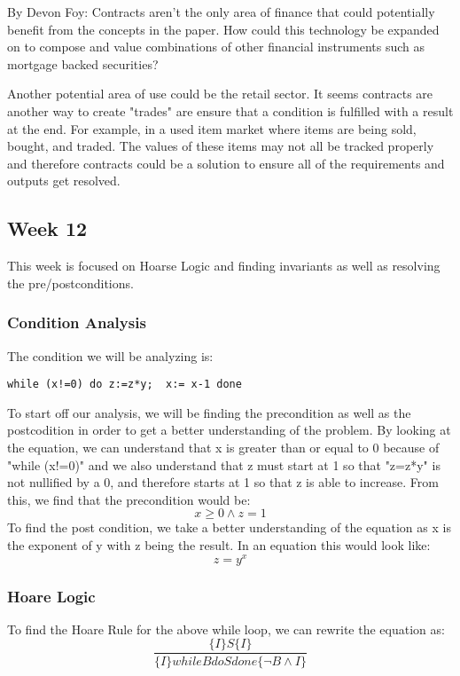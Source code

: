 \documentclass{article}
\theoremstyle{theorem}
\theoremstyle{definition}
\theoremstyle{remark}
\begin{document}
\medskip
By Devon Foy: Contracts aren't the only area of finance that could potentially benefit from the concepts in the paper. How could this technology be expanded on to compose and value combinations of other financial instruments such as mortgage backed securities?

\medskip
Another potential area of use could be the retail sector. It seems contracts are another way to create "trades" are ensure that a condition is fulfilled with a result at the end. For example, in a used item market where items are being sold, bought, and traded. The values of these items may not all be tracked properly and therefore contracts could be a solution to ensure all of the requirements and outputs get resolved.

\subsection{Week 12}
This week is focused on Hoarse Logic and finding invariants as well as resolving the pre/postconditions. 

\subsubsection{Condition Analysis}
The condition we will be analyzing is:
\begin{lstlisting}
while (x!=0) do z:=z*y;  x:= x-1 done
\end{lstlisting}

\medskip
To start off our analysis, we will be finding the precondition as well as the postcodition in order to get a better understanding of the problem. By looking at the equation, we can understand that x is greater than or equal to 0 because of "while (x!=0)" and we also understand that z must start at 1 so that "z=z*y" is not nullified by a 0, and therefore starts at 1 so that z is able to increase. From this, we find that the precondition would be: $$x \geq 0 \wedge z = 1$$ To find the post condition, we take a better understanding of the equation as x is the exponent of y with z being the result. In an equation this would look like: $$z = y^x$$

\subsubsection{Hoare Logic}
To find the Hoare Rule for the above while loop, we can rewrite the equation as:
$$\frac{\{I\}S\{I\}}{\{I\}while B do S done \{ \neg B \wedge I \}}$$
\end{document}
